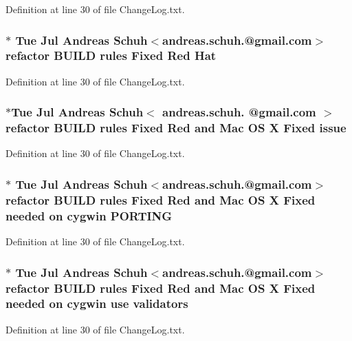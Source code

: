 Definition at line 30 of file Change\+Log.\+txt.

\subsubsection[{\texorpdfstring{Hat}{Hat}}]{\setlength{\rightskip}{0pt plus 5cm}$\ast$ Tue Jul Andreas Schuh$<$andreas.\+schuh.@gmail.\+com$>$ refactor B\+U\+I\+LD rules Fixed Red Hat}\hypertarget{ChangeLog_8txt_ab6af3f9cddd94679b669cc1d47b9797d}{}\label{ChangeLog_8txt_ab6af3f9cddd94679b669cc1d47b9797d}


Definition at line 30 of file Change\+Log.\+txt.

\subsubsection[{\texorpdfstring{issue}{issue}}]{\setlength{\rightskip}{0pt plus 5cm}$\ast$Tue Jul Andreas Schuh$<$ andreas.\+schuh. @gmail.\+com $>$ refactor B\+U\+I\+LD rules Fixed Red and Mac OS X Fixed issue}\hypertarget{ChangeLog_8txt_a9ee32034872bd5334c09a83bf666f31f}{}\label{ChangeLog_8txt_a9ee32034872bd5334c09a83bf666f31f}


Definition at line 30 of file Change\+Log.\+txt.

\subsubsection[{\texorpdfstring{P\+O\+R\+T\+I\+NG}{PORTING}}]{\setlength{\rightskip}{0pt plus 5cm}$\ast$ Tue Jul Andreas Schuh$<$andreas.\+schuh.@gmail.\+com$>$ refactor B\+U\+I\+LD rules Fixed Red and Mac OS X Fixed needed on cygwin P\+O\+R\+T\+I\+NG}\hypertarget{ChangeLog_8txt_a3b1b71f7c8079cb927f9139037c375f6}{}\label{ChangeLog_8txt_a3b1b71f7c8079cb927f9139037c375f6}


Definition at line 30 of file Change\+Log.\+txt.

\subsubsection[{\texorpdfstring{validators}{validators}}]{\setlength{\rightskip}{0pt plus 5cm}$\ast$ Tue Jul Andreas Schuh$<$andreas.\+schuh.@gmail.\+com$>$ refactor B\+U\+I\+LD rules Fixed Red and Mac OS X Fixed needed on cygwin use validators}\hypertarget{ChangeLog_8txt_a463f52dbd9b85614adaa6471eb5fc93d}{}\label{ChangeLog_8txt_a463f52dbd9b85614adaa6471eb5fc93d}


Definition at line 30 of file Change\+Log.\+txt.

